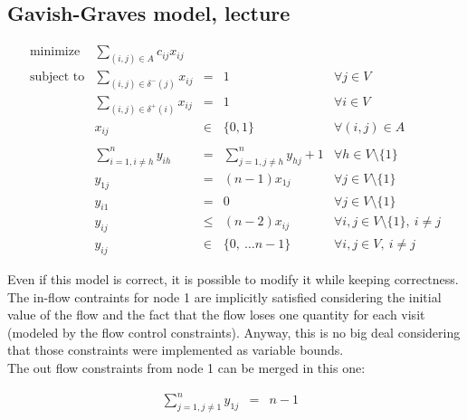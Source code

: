 \subsection{Gavish-Graves model, lecture}
\begin{equation*}
    \begin{array}{lrllr}
        \textrm{minimize}   & \displaystyle\sum_{(i, j) \in A} c_{ij}  x_{ij} \\
        \textrm{subject to} & \displaystyle\sum\limits_{(i, j) \in \delta^-(j)}  x_{ij} & = & 1 & \forall j \in V\\
                            & \displaystyle\sum\limits_{(i, j) \in \delta^+(i)}  x_{ij} & = & 1 & \forall i \in V\\
                            & x_{ij} & \in & \{0,1\} & \forall (i,j) \in A \\ \\
                            & \displaystyle\sum\limits_{i = 1, i \neq h}^n y_{ih} & = & \displaystyle\sum\limits_{j = 1, j \neq h}^n y_{hj} + 1 & \forall h \in V \setminus \{1\}\\
                            & y_{1j} & = & (n - 1) x_{1j} & \forall j \in V \setminus \{1\} \\
                            & y_{i1} & = & 0 & \forall j \in V \setminus \{1\} \\
                            & y_{ij} & \leq & (n - 2) x_{ij} & \forall i, j \in V \setminus \{1\},\ i \neq j \\
                            & y_{ij} & \in & \{0,\ \dots n-1\} & \forall i,j \in V,\ i \neq j
    \end{array}
\end{equation*}

Even if this model is correct, it is possible to modify it while keeping
correctness. The in-flow contraints for node 1 are implicitly satisfied
considering the initial value of the flow and the fact that the flow loses one
quantity for each visit (modeled by the flow control constraints). Anyway, this
is no big deal considering that those constraints were implemented as variable
bounds.\\ The out flow constraints from node 1 can be merged in this one:

\begin{equation*} 
    \begin{array}{rrlr} 
        \displaystyle\sum\limits_{j = 1, j \neq 1}^n y_{1j} & = & n - 1 & \\
    \end{array} 
\end{equation*}

